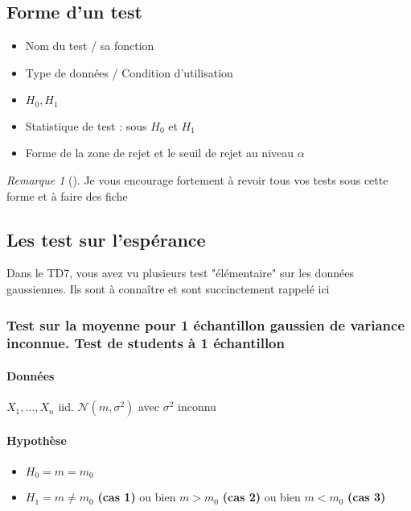 \documentclass{article}
\theoremstyle{plain}%
\theoremstyle{definition}
\theoremstyle{remark}
\newtheorem*{rem}{Remarque}
\begin{document}
\subsection{Forme d'un test} 
\begin{itemize}
    \item Nom du test / sa fonction
    \item Type de données / Condition d'utilisation
    \item $ H_0, H_1 $ 
    \item Statistique de test : sous $ H_0 $ et $ H_1 $ 
    \item Forme de la zone de rejet et le seuil de rejet au niveau $ \alpha  $ 
\end{itemize}
\begin{rem}[]
    Je vous encourage fortement à revoir tous vos tests sous cette forme et à faire des fiche
\end{rem}

\subsection{Les test sur l'espérance}
Dans le TD7, vous avez vu plusieurs test "élémentaire" sur les données gaussiennes. Ils sont à connaître et sont succinctement rappelé ici

\subsubsection{Test sur la moyenne pour 1 échantillon gaussien de variance inconnue. Test de students à 1 échantillon}

\paragraph*{Données} $ X_1, \dots, X_n $ iid. $ \mathcal{N}(m, \sigma ^2) $ avec $ \sigma ^2 $ inconnu

\paragraph*{Hypothèse}\begin{itemize}
    \item $ H_0 = m = m_0$ 
    \item $ H_1 = m \neq m_0$ \textbf{(cas 1)} ou bien $ m>m_0 $ \textbf{(cas 2)} ou bien $ m < m_0 $ \textbf{(cas 3)}
\end{itemize}
\end{document}
